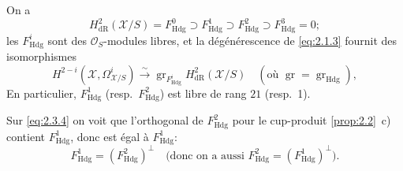 \documentclass[12pt,a4paper]{article}
\theoremstyle{plain}
\theoremstyle{definition}
\theoremstyle{remark}
\DeclareMathOperator{\gr}{gr}
\newcommand{\Hdg}{\mathrm{Hdg}}
\begin{document}
On a
\begin{equation}\label{eq:2.3.5}
H^2_{\mathrm{dR}}(\mathcal{X}/S) = F^0_{\Hdg} \supset F^1_{\Hdg} \supset F^2_{\Hdg} \supset F^3_{\Hdg} = 0;
\end{equation}
les $F^i_{\Hdg}$ sont des $\mathcal{O}_S$-modules libres, et la dégénérescence de \eqref{eq:2.1.3} fournit des isomorphismes
\begin{equation}\label{eq:2.3.6}
H^{2-i}(\mathcal{X}, \Omega^i_{\mathcal{X}/S}) \xrightarrow{\sim} \gr_{F^i_{\Hdg}} H^2_{\mathrm{dR}}(\mathcal{X}/S) \quad (\text{où } \gr = \gr_{\Hdg}),
\end{equation}
En particulier, $F^1_{\Hdg}$ (resp.~$F^2_{\Hdg}$) est libre de rang $21$ (resp.~1).

Sur \eqref{eq:2.3.4} on voit que l'orthogonal de $F^2_{\Hdg}$ pour le cup-produit \ref{prop:2.2}~c) contient $F^1_{\Hdg}$, donc est égal à $F^1_{\Hdg}$:
\begin{equation}\label{eq:2.3.7}
F^1_{\Hdg} = (F^2_{\Hdg})^{\perp} \quad \text{(donc on a aussi } F^2_{\Hdg} = (F^1_{\Hdg})^{\perp}).
\end{equation}
\end{document}
